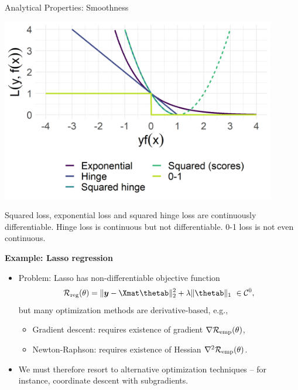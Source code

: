 \begin{vbframe}{Analytical Properties: Smoothness}
\begin{minipage}[c]{0.4\textwidth}
  \includegraphics[width=0.9\textwidth]{figure/plot_loss_overview_classif}
\end{minipage}%
\begin{minipage}[c]{0.05\textwidth}
  \phantom{foo}
\end{minipage}%
\begin{minipage}[c]{0.55\textwidth}
  \footnotesize \raggedright
  Squared loss, exponential loss and squared hinge loss are continuously 
  differentiable. Hinge loss is continuous but not differentiable. 
  0-1 loss is not even continuous.
\end{minipage}%

\framebreak

\small
\textbf{Example: Lasso regression}

\begin{itemize}
  \small
  \item Problem: Lasso has non-differentiable 
  objective function $$\riskrt = \| \yv - \Xmat \thetab \|^2_2
  + \lambda \| 
  \thetab \|_1 ~ \in \mathcal{C}^0,$$
  but many optimization methods are derivative-based, e.g.,
  \begin{itemize}
    \small
    \item Gradient descent: requires existence of gradient $\nabla \mathcal{R}_{\text{emp}}(\theta)$, 
    \item Newton-Raphson: requires existence of Hessian $\nabla^2 \mathcal{R}_{\text{emp}}(\theta)$.
  \end{itemize}
  \item We must therefore resort to alternative optimization 
  techniques -- for instance, coordinate descent with subgradients.
\end{itemize}


\end{vbframe}
